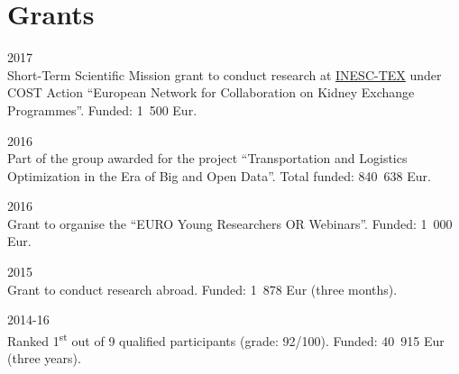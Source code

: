 \section*{Grants}

\begin{paracol}{2}
  \textsc{2017}
\switchcolumn
  \\
  Short-Term Scientific Mission grant to conduct research at \href{https://www.inesctec.pt/}{INESC-TEX} under COST Action ``European Network for Collaboration on Kidney Exchange Programmes''.
  Funded: 1~500 Eur.
\end{paracol}

\begin{paracol}{2}
  \textsc{2016}
\switchcolumn
  \\
  Part of the group awarded for the project ``Transportation and Logistics Optimization in the Era of Big and Open Data''.
  Total funded: 840~638 Eur.
\end{paracol}

\begin{paracol}{2}
  \textsc{2016}
\switchcolumn
  \\
  Grant to organise the ``EURO Young Researchers OR Webinars''.
  Funded: 1~000 Eur.
\end{paracol}

\begin{paracol}{2}
  \textsc{2015}
\switchcolumn
  \\
  Grant to conduct research abroad.
  Funded: 1~878 Eur (three months).
\end{paracol}

\begin{paracol}{2}
  \textsc{2014-16}
\switchcolumn
  \\
  Ranked 1\textsuperscript{st} out of 9 qualified participants (grade: 92/100).
  Funded: 40~915 Eur (three years).
\end{paracol}

